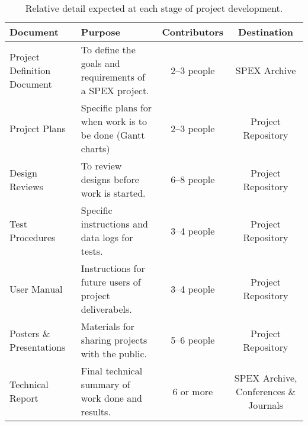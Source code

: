 \documentclass[conference]{IEEEtran} %
\begin{document}
\begin{table*}
    \caption{Relative detail expected at each stage of project development.}
    \centering
    \begin{tabularx}{\textwidth}{@{}lXcc@{}}
        \toprule %
        Document & Purpose & Contributors & Destination \\
        \midrule %
        Project Definition Document & To define the goals and requirements of a SPEX project. & 2--3 people & SPEX Archive \\
        Project Plans & Specific plans for when work is to be done (Gantt charts) & 2--3 people & Project Repository \\
        Design Reviews & To review designs before work is started. & 6--8 people & Project Repository \\
        Test Procedures & Specific instructions and data logs for tests. & 3--4 people & Project Repository \\
        User Manual & Instructions for future users of project deliverabels. & 3--4 people & Project Repository \\
        Posters \& Presentations & Materials for sharing projects with the public. & 5--6 people & Project Repository \\
        Technical Report & Final technical summary of work done and results. & 6 or more & SPEX Archive, Conferences \& Journals \\
        \bottomrule
    \end{tabularx}
\label{tab:long-example}
\end{table*}
\end{document}
